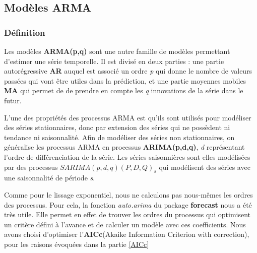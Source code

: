 \documentclass[11pt,]{article}
\begin{document}
\subsection{Modèles ARMA}\label{modeles-arma}

\subsubsection{Définition}\label{definition-1}

Les modèles \textbf{ARMA(p,q)} sont une autre famille de modèles
permettant d'estimer une série temporelle. Il est divisé en deux parties
: une partie autorégressive \textbf{AR} auquel est associé un ordre
\emph{p} qui donne le nombre de valeurs passées qui vont être utiles
dans la prédiction, et une partie moyennes mobiles \textbf{MA} qui
permet de de prendre en compte les \emph{q} innovations de la série dans
le futur.

L'une des propriétés des processus ARMA est qu'ils sont utilisés pour
modéliser des séries stationnaires, donc par extension des séries qui ne
possèdent ni tendance ni saisonnalité. Afin de modéliser des séries non
stationnaires, on généralise les processus ARMA en processus
\textbf{ARIMA(p,d,q)}, \emph{d} représentant l'ordre de différenciation
de la série. Les séries saisonnières sont elles modélisées par des
processus \textbf{\(SARIMA(p ,d, q)(P, D, Q)_s\)} qui modélisent des
séries avec une saisonnalité de période \emph{s}.

Comme pour le lissage exponentiel, nous ne calculons pas nous-mêmes les
ordres des processus. Pour cela, la fonction \emph{auto.arima} du
package \textbf{forecast} nous a été très utile. Elle permet en effet de
trouver les ordres du processus qui optimisent un critère défini à
l'avance et de calculer un modèle avec ces coefficients. Nous avons
choisi d'optimiser l'\textbf{AICc}(Akaike Information Criterion with
correction), pour les raisons évoquées dans la partie \ref{AICc}
\end{document}
